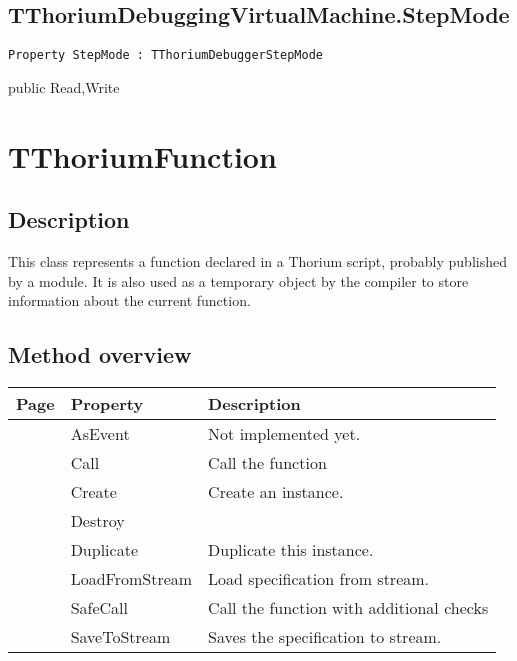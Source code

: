 \subsection{TThoriumDebuggingVirtualMachine.StepMode}
\label{thoriumcorepkg:thorium:tthoriumdebuggingvirtualmachine:stepmode}
\begin{FPCList}
\Declaration 

\begin{verbatim}
Property StepMode : TThoriumDebuggerStepMode
\end{verbatim}
\Visibility
public
\Access
Read,Write
\end{FPCList}
\section{TThoriumFunction}
\label{thoriumcorepkg:thorium:tthoriumfunction}
\subsection{Description}
This class represents a function declared in a Thorium script, probably published by a module. It is also used as a temporary object by the compiler to store information about the current function.%
\subsection{Method overview}
\label{thoriumcorepkg:thorium:tthoriumfunction:methods}
\begin{tabularx}{\textwidth}{llX}
Page & Property & Description  \\ \hline
\pageref{thoriumcorepkg:thorium:tthoriumfunction:asevent} & AsEvent  & Not implemented yet. \\
\pageref{thoriumcorepkg:thorium:tthoriumfunction:call} & Call  & Call the function \\
\pageref{thoriumcorepkg:thorium:tthoriumfunction:create} & Create  & Create an instance. \\
\pageref{thoriumcorepkg:thorium:tthoriumfunction:destroy} & Destroy  &  \\
\pageref{thoriumcorepkg:thorium:tthoriumfunction:duplicate} & Duplicate  & Duplicate this instance. \\
\pageref{thoriumcorepkg:thorium:tthoriumfunction:loadfromstream} & LoadFromStream  & Load specification from stream. \\
\pageref{thoriumcorepkg:thorium:tthoriumfunction:safecall} & SafeCall  & Call the function with additional checks \\
\pageref{thoriumcorepkg:thorium:tthoriumfunction:savetostream} & SaveToStream  & Saves the specification to stream. \\
\hline
\end{tabularx}

